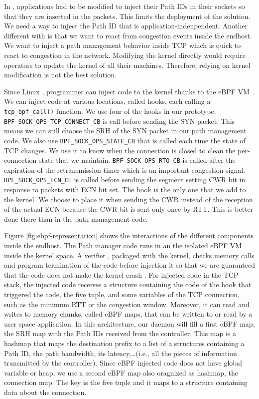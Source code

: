 In \cite{srn}, applications had to be modified to inject their Path IDs in their sockets
so that they are inserted in the packets.
This limits the deployment of the solution.
We need a way to inject the Path ID that is application-indenpendent.
Another different with \cite{srn} is that we want to react from congestion events inside the endhost.
We want to inject a path management behavior inside TCP which is quick to react to congestion in the network.
Modifying the kernel directly would require operators to update the kernel of all their machines.
Therefore, relying on kernel modification is not the best solution.

Since Linux , programmer can inject code to the kernel thanks to the eBPF VM~\cite{ebpf}.
We can inject code at various locations, called hooks, each calling a \texttt{tcp\_bpf\_call()} function.
We use four of the hooks in our prototype. \texttt{BPF\_SOCK\_OPS\_TCP\_CONNECT\_CB}
is call before sending the SYN packet. This means we can still choose the SRH of the SYN packet in
our path management code. We also use \texttt{BPF\_SOCK\_OPS\_STATE\_CB} that is called each time the state
of TCP changes. We use it to know when the connection is closed to clean the per-connection state that we maintain.
\texttt{BPF\_SOCK\_OPS\_RTO\_CB} is called after the expiration of the retransmission timer
which is an important congestion signal.
\texttt{BPF\_SOCK\_OPS\_ECN\_CE} is called before sending the segment setting CWR bit
in response to packets with ECN bit set. The hook is the only one that we add to the kernel.
We choose to place it when sending the CWR instead of the reception of the actual ECN because
the CWR bit is sent only once by RTT. This is better done there than in the path management code.

Figure \ref{fig:ebpf-representation} shows the interactions
of the different components inside the endhost.
The Path manager code runs in an the isolated eBPF VM inside the kernel space.
A verifier \cite{ebpf-verifier}, packaged with the kernel, checks memory calls and program termination of the code
before injection it so that we are guaranteed that the code does not make the kernel crash .
For injected code in the TCP stack, the injected code receives a structure
containing the code of the hook that triggered the code, the five tuple,
and some variables of the TCP connection, such as the minimum RTT or the congestion window.
Moreover, it can read and writes to memory chunks, called eBPF maps, that can be written to or read
by a user space application. In this architecture, our daemon will fill a first eBPF map, the SRH map
with the Path IDs received from the controller.
This map is a hashmap that maps the destination prefix to a list of a structures containing a Path ID,
the path bandwidth, its latency,\dots (i.e., all the pieces of information transmitted by the controller).
Since eBPF injected code does not have global variable or heap, we use a second eBPF map also oragnized as hashmap,
the connection map.
The key is the five tuple and it maps to a structure containing data about the connection.

